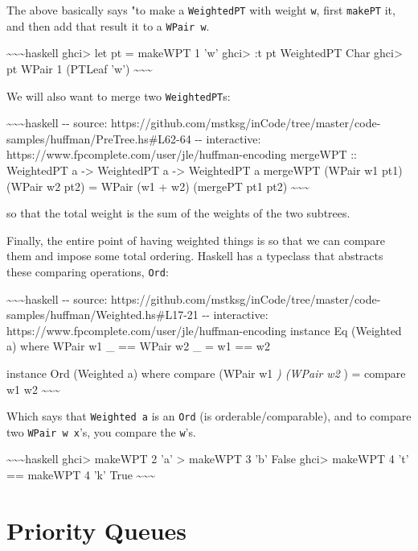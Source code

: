 \documentclass[]{article}
\begin{document}
The above basically says "to make a \texttt{WeightedPT} with weight \texttt{w},
first \texttt{makePT} it, and then add that result it to a \texttt{WPair\ w}.

\textasciitilde{}\textasciitilde{}\textasciitilde{}haskell ghci\textgreater{}
let pt = makeWPT 1 'w' ghci\textgreater{} :t pt WeightedPT Char
ghci\textgreater{} pt WPair 1 (PTLeaf 'w')
\textasciitilde{}\textasciitilde{}\textasciitilde{}

We will also want to merge two \texttt{WeightedPT}s:

\textasciitilde{}\textasciitilde{}\textasciitilde{}haskell -\/- source:
https://github.com/mstksg/inCode/tree/master/code-samples/huffman/PreTree.hs\#L62-64
-\/- interactive: https://www.fpcomplete.com/user/jle/huffman-encoding mergeWPT
:: WeightedPT a -\textgreater{} WeightedPT a -\textgreater{} WeightedPT a
mergeWPT (WPair w1 pt1) (WPair w2 pt2) = WPair (w1 + w2) (mergePT pt1 pt2)
\textasciitilde{}\textasciitilde{}\textasciitilde{}

so that the total weight is the sum of the weights of the two subtrees.

Finally, the entire point of having weighted things is so that we can compare
them and impose some total ordering. Haskell has a typeclass that abstracts
these comparing operations, \texttt{Ord}:

\textasciitilde{}\textasciitilde{}\textasciitilde{}haskell -\/- source:
https://github.com/mstksg/inCode/tree/master/code-samples/huffman/Weighted.hs\#L17-21
-\/- interactive: https://www.fpcomplete.com/user/jle/huffman-encoding instance
Eq (Weighted a) where WPair w1 \_ == WPair w2 \_ = w1 == w2

instance Ord (Weighted a) where compare (WPair w1 \emph{) (WPair w2 }) = compare
w1 w2 \textasciitilde{}\textasciitilde{}\textasciitilde{}

Which says that \texttt{Weighted\ a} is an \texttt{Ord} (is
orderable/comparable), and to compare two \texttt{WPair\ w\ x}'s, you compare
the \texttt{w}'s.

\textasciitilde{}\textasciitilde{}\textasciitilde{}haskell ghci\textgreater{}
makeWPT 2 'a' \textgreater{} makeWPT 3 'b' False ghci\textgreater{} makeWPT 4
't' == makeWPT 4 'k' True \textasciitilde{}\textasciitilde{}\textasciitilde{}

\section{Priority Queues}
\end{document}
